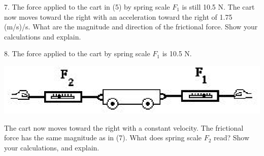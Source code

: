 7. The force applied to the cart in (5) by spring scale \( F_{1} \) is still
10.5 N. The cart now moves toward the right with an acceleration toward the
right of 1.75 (m/s)/s. What are the magnitude and direction of the frictional
force. Show your calculations and explain.
\vspace{20mm}

8. The force applied to the cart by spring scale \( F_{1} \) is 10.5 N.

\vspace{0.3cm}
{\par\centering \includegraphics{combining/combining_fig4.eps} \par}
\vspace{0.3cm}

The cart now moves toward the right with a constant velocity. The frictional
force has the same magnitude as in (7). What does spring scale \( F_{2} \)
read? Show your calculations, and explain.

